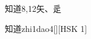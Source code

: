 \begin{entry}{知道}{8,12}{⽮、⾡}
  \begin{phonetics}{知道}{zhi1dao4}[][HSK 1]
  \end{phonetics}
\end{entry}
